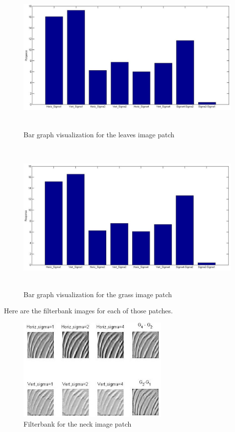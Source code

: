 \documentclass[11pt,psfig]{article}
\begin{document}
\begin{figure}[H]
\centering
\includegraphics[height=3in]{prob3patch2bar.jpg}
\caption{Bar graph visualization for the leaves image patch}
\end{figure}

\begin{figure}[H]
\centering
\includegraphics[height=3in]{prob3patch3bar.jpg}
\caption{Bar graph visualization for the grass image patch}
\end{figure}

Here are the filterbank images for each of those patches. 

\begin{figure}[H]
\centering
\includegraphics[height=2in]{prob3patch1filter.jpg}
\caption{Filterbank for the neck image patch}
\end{figure}
\end{document}
